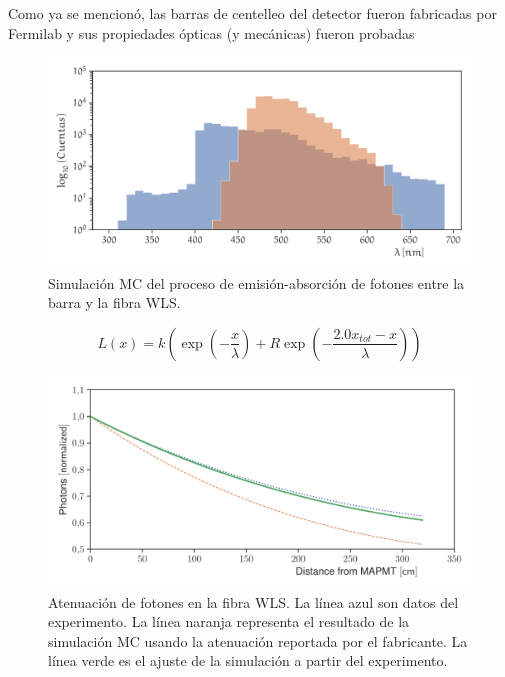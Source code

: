 Como ya se mencionó, las barras de centelleo del detector fueron fabricadas por Fermilab y sus propiedades ópticas (y mecánicas) fueron probadas



\begin{figure}
        \centering
        \includegraphics[width=\textwidth]{sim-optics-spect.pdf}
        \caption{Simulación MC del proceso de emisión-absorción de fotones entre la barra y la fibra WLS.}
        \label{fig:sim-optics}
\end{figure}

\begin{equation}
\label{equ:fiber-att}
L(x)=k\left(\exp\left(-\frac{x}{\lambda}\right) +R\exp\left(-\frac{2.0x_{tot}-x}{\lambda}\right)\right)
\end{equation}

\begin{figure}
        \centering
        \includegraphics[width=\textwidth]{data_atlength.pdf}
        \caption{Atenuación de fotones en la fibra WLS. La línea azul son datos del experimento. La línea naranja representa el resultado de la simulación MC usando la atenuación reportada por el fabricante. La línea verde es el ajuste de la simulación a partir del experimento.}
        \label{fig:atlength}
\end{figure}

